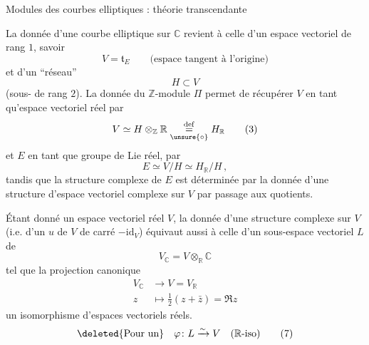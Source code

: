 Modules des courbes elliptiques : théorie transcendante

La donnée d'une courbe elliptique  sur $\mathbb C$ revient à celle  d'un espace vectoriel de rang $1$, savoir 
\[
 V=\mathfrak t_E \qquad \text{(espace tangent à l'origine)} \tag*{(1)}
\]
et d'un ``réseau''
\[
 H\subset V \tag*{(2)}
\]
(sous- de rang $2$). La donnée du  $\mathbb Z$-module $\Pi$ permet de récupérer $V$ en tant qu'espace vectoriel réel  par
\[
 V\simeq H\otimes_{\mathbb Z}\mathbb R\mathrel{\underset{\unsure{\circ}}{\overset{\mathrm{def}}{=}}}H_{\mathbb R} \tag*{(3)}
\]
et $E$ en tant que groupe de Lie réel, par
\[
 E\simeq V/H\simeq H_{\mathbb R}/H\,, \tag*{(4)}
\]
tandis que la structure complexe de $E$ est déterminée par la donnée d'une structure d'espace vectoriel complexe sur $V$ par passage aux quotients.

Étant donné un espace vectoriel réel $V$, la donnée d'une structure complexe sur $V$ (i.e. d'un  $u$ de $V$ de carré $-\mathrm{id}_V$) équivaut aussi à celle d'un sous-espace vectoriel $L$ de 
\[
 V_{\mathbb C}=V\otimes_{\mathbb R}\mathbb C \tag*{(5)}
\]
tel que la projection canonique
\[
 \begin{aligned}
 V_{\mathbb C}&\longrightarrow V=V_{\mathbb R}\\
 z&\longmapsto \tfrac12(z+\bar z)=\Re z
 \end{aligned} \tag*{(6)}
\]
  un isomorphisme d'espaces vectoriels réels.
\[
 \text{\deleted{Pour un}}\quad\varphi\colon L\xrightarrow{\sim}V\quad(\mathbb R\text{-iso}) \tag*{(7)}
\]
